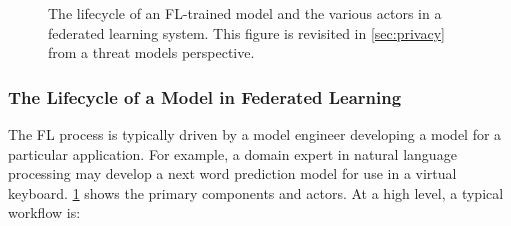 \documentclass[11pt]{article}
\begin{document}
\savebox{}

\begin{figure}[t!] 
\noindent\usebox{\actorsfigure}
\caption{The lifecycle of an FL-trained model and the various actors in a federated learning system. This figure is revisited in \cref{sec:privacy} from a threat models perspective. 
} 
\label{fig:actors}
\end{figure}

\subsubsection{The Lifecycle of a Model in Federated Learning}\label{sec:lifecycle}
The FL process is typically driven by a model engineer developing a model for a particular application. For example, a domain expert in natural language processing may develop a next word prediction model for use in a virtual keyboard. \cref{fig:actors} shows the primary components and actors. At a high level, a typical workflow is:
\end{document}
